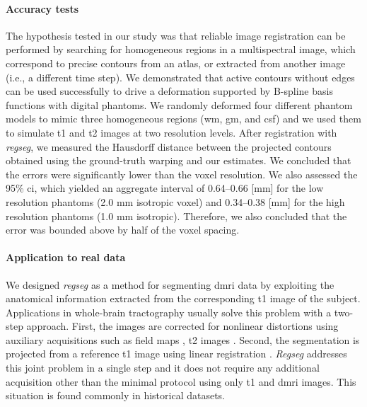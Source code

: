 \documentclass[3p,authoryear,fleqn]{elsarticle}
\providecommand{\regseg}{\emph{regseg}}
\providecommand{\Regseg}{\emph{Regseg}}
\begin{document}
\paragraph*{Accuracy tests}
The hypothesis tested in our study was that reliable image registration can be performed
  by searching for homogeneous regions in a multispectral image, which correspond to precise contours
  from an atlas, or extracted from another image (i.e., a different time step).
We demonstrated that active contours without edges can be used successfully to drive a
  deformation supported by B-spline basis functions with digital phantoms.
We randomly deformed four different phantom models to mimic three homogeneous regions
  (\gls*{wm}, \gls*{gm}, and \acrlong*{csf}) and we used them to simulate \gls*{t1} and \gls*{t2}
  images at two resolution levels.
After registration with \regseg{}, we measured the Hausdorff distance between the
  projected contours obtained using the ground-truth warping and our estimates.
We concluded that the errors were significantly lower than the voxel resolution.
We also assessed the 95\% \gls*{ci}, which yielded an aggregate interval of
  0.64--0.66 [mm] for the low resolution phantoms (2.0 mm isotropic voxel) and
  0.34--0.38 [mm] for the high resolution phantoms (1.0 mm isotropic).
Therefore, we also concluded that the error was bounded above by half of the
  voxel spacing.

\paragraph*{Application to real data}
We designed \regseg{} as a method for segmenting \gls*{dmri} data by exploiting the
  anatomical information extracted from the corresponding \gls*{t1} image of the subject.
Applications in whole-brain tractography \citep{smith_tractbased_2006,craddock_imaging_2013}
  usually solve this problem with a two-step approach.
First, the images are corrected for nonlinear distortions using auxiliary acquisitions
  such as field maps \citep{jezzard_correction_1995}, \gls*{t2} images \citep{kybic_unwarping_2000}.
Second, the segmentation is projected from a reference \gls*{t1} image using linear
  registration \citep{greve_accurate_2009}.
\Regseg{} addresses this joint problem in a single step and it does not require any additional
  acquisition other than the minimal protocol using only \gls*{t1} and \gls*{dmri} images.
This situation is found commonly in historical datasets.
\end{document}
